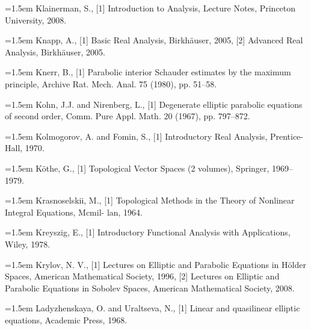 \noindent\hangindent=1.5em Klainerman, S., \hypertarget{ref:Klainerman-1}{[1]} Introduction to Analysis, Lecture Notes, Princeton University, 2008.\par{}
\noindent\hangindent=1.5em Knapp, A., \hypertarget{ref:Knapp-1}{[1]} Basic Real Analysis, Birkhäuser, 2005, \hypertarget{ref:Knapp-2}{[2]} Advanced Real Analysis, Birkhäuser, 2005.\par{}
\noindent\hangindent=1.5em Knerr, B., \hypertarget{ref:Knerr-1}{[1]} Parabolic interior Schauder estimates by the maximum principle, Archive Rat. Mech. Anal. 75 (1980), pp. 51--58.\par{}
\noindent\hangindent=1.5em Kohn, J.J. and Nirenberg, L., \hypertarget{ref:KohnNirenberg-1}{[1]} Degenerate elliptic parabolic equations of second order, Comm. Pure Appl. Math. 20 (1967), pp. 797--872.\par{}
\noindent\hangindent=1.5em Kolmogorov, A. and Fomin, S., \hypertarget{ref:KolmogorovFomin-1}{[1]} Introductory Real Analysis, Prentice-Hall, 1970.\par{}
\noindent\hangindent=1.5em Köthe, G., \hypertarget{ref:Kothe-1}{[1]} Topological Vector Spaces (2 volumes), Springer, 1969--1979.\par{}
\noindent\hangindent=1.5em Krasnoselskii, M., \hypertarget{ref:Krasnoselskii-1}{[1]} Topological Methods in the Theory of Nonlinear Integral Equations, Mcmil- lan, 1964.\par{}
\noindent\hangindent=1.5em Kreyszig, E., \hypertarget{ref:Kreyszig-1}{[1]} Introductory Functional Analysis with Applications, Wiley, 1978.\par{}
\noindent\hangindent=1.5em Krylov, N. V., \hypertarget{ref:Krylov-1}{[1]} Lectures on Elliptic and Parabolic Equations in Hölder Spaces, American Mathematical Society, 1996, \hypertarget{ref:Krylov-2}{[2]} Lectures on Elliptic and Parabolic Equations in Sobolev Spaces, American Mathematical Society, 2008.\par{}
\noindent\hangindent=1.5em Ladyzhenskaya, O. and Uraltseva, N., \hypertarget{ref:Ladyzhenskaya-1}{[1]} Linear and quasilinear elliptic equations, Academic Press, 1968.\par{}
